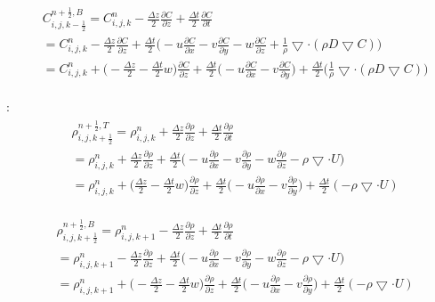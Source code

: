 \documentclass{article}
\numberwithin{equation}{subsection}
\begin{document}
\begin{align}
\begin{split}
& C_{i,j,k-\frac{1}{2}}^{n+\frac{1}{2},B} = C_{i,j,k}^n - \frac{\Delta z}{2} \frac{\partial C}{\partial z} + \frac{\Delta t}{2} \frac{\partial C}{\partial t} \\
& = C_{i,j,k}^{n} - \frac{\Delta z}{2} \frac{\partial C}{\partial z} + \frac{\Delta t}{2} \Big( -u\frac{\partial C}{\partial x} - v\frac{\partial C}{\partial y} - w\frac{\partial C}{\partial z} + \frac{1}{\rho} \bigtriangledown \cdot( \rho D \bigtriangledown C) \Big) \\
& = C_{i,j,k}^{n} + \Big( -\frac{\Delta z}{2} - \frac{\Delta t}{2}w\Big)\frac{\partial C}{\partial z} + \frac{\Delta t}{2} \Big( -u\frac{\partial C}{\partial x} -v\frac{\partial C}{\partial y} \big) + \frac{\Delta t}{2} \Big( \frac{1}{\rho} \bigtriangledown \cdot( \rho D \bigtriangledown C)\Big)
\end{split}
\end{align}

:
\begin{align}
\begin{split}
& \rho_{i,j,k+\frac{1}{2}}^{n+\frac{1}{2},T} = \rho_{i,j,k}^n + \frac{\Delta z}{2} \frac{\partial \rho}{\partial z} + \frac{\Delta t}{2} \frac{\partial \rho}{\partial t} \\
& = \rho_{i,j,k}^{n} + \frac{\Delta z}{2} \frac{\partial \rho}{\partial z} + \frac{\Delta t}{2} \Big( -u\frac{\partial \rho}{\partial x} - v\frac{\partial \rho}{\partial y} - w\frac{\partial \rho}{\partial z} - \rho \bigtriangledown \cdot U \Big) \\
& = \rho_{i,j,k}^{n} + \big( \frac{\Delta z}{2} - \frac{\Delta t}{2}w\big)\frac{\partial \rho}{\partial z} + \frac{\Delta t}{2} \big( - u\frac{\partial \rho}{\partial x} - v\frac{\partial \rho}{\partial y} \big) + \frac{\Delta t}{2} (-\rho \bigtriangledown \cdot U)
\end{split}
\end{align}

\begin{align}
\begin{split}
& \rho_{i,j,k+\frac{1}{2}}^{n+\frac{1}{2},B} = \rho_{i,j,k+1}^n - \frac{\Delta z}{2} \frac{\partial \rho}{\partial z} + \frac{\Delta t}{2} \frac{\partial \rho}{\partial t} \\
& = \rho_{i,j,k+1}^{n} - \frac{\Delta z}{2} \frac{\partial \rho}{\partial z} + \frac{\Delta t}{2} \Big( -u\frac{\partial \rho}{\partial x} - v\frac{\partial \rho}{\partial y} - w\frac{\partial \rho}{\partial z} - \rho \bigtriangledown \cdot U \Big) \\
& = \rho_{i,j,k+1}^{n} + \big( -\frac{\Delta z}{2} - \frac{\Delta t}{2}w\big)\frac{\partial \rho}{\partial z} + \frac{\Delta t}{2} \big( - u\frac{\partial \rho}{\partial x} - v\frac{\partial \rho}{\partial y} \big) + \frac{\Delta t}{2} (-\rho \bigtriangledown \cdot U)
\end{split}
\end{align}
\end{document}
